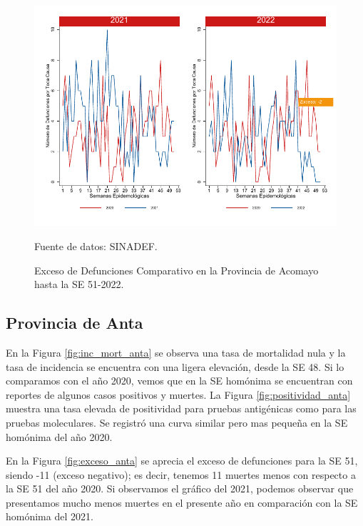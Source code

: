 \documentclass[12pt,a4paper,openany]{book}
\begin{document}
	\begin{figure}[h]
		\caption{Exceso de Defunciones Comparativo en la Provincia de Acomayo hasta la SE 51-2022.}\label{fig:exceso_acomayo}
		\begin{center}
			\includegraphics[width=0.7\linewidth]{../figuras/exceso_1.pdf}
		\end{center}
		{\footnotesize {Fuente de datos: SINADEF.}}
	\end{figure}
	
	\clearpage
	
	\subsection*{Provincia de Anta}
	\noindent En la Figura \ref{fig:inc_mort_anta} se observa una tasa de mortalidad nula y la tasa de incidencia se encuentra con una ligera elevación, desde la SE 48. Si lo comparamos con el año 2020, vemos que en la SE homónima se encuentran con reportes de algunos casos positivos y muertes.
	\noindent La Figura \ref{fig:positividad_anta} muestra una tasa elevada de positividad para pruebas antigénicas como para las pruebas moleculares. Se registró una curva similar pero mas pequeña en la SE homónima del año 2020.
	
	En la Figura \ref{fig:exceso_anta} se aprecia el exceso de defunciones para la SE 51, siendo -11 (exceso negativo); es decir, tenemos 11 muertes menos con respecto a la SE 51 del año 2020. Si observamos el gráfico del 2021, podemos observar que  presentamos mucho menos muertes en el presente año en comparación con la SE homónima del 2021.
	
\end{document}

